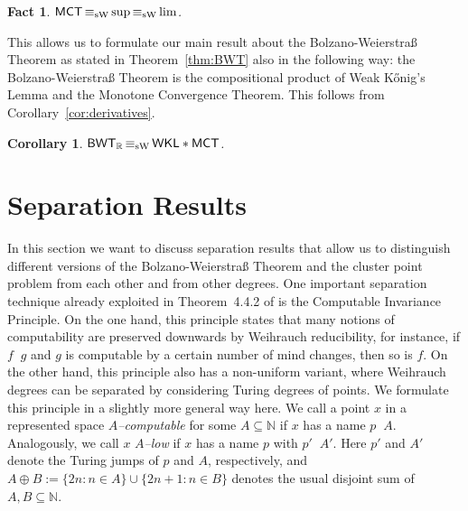 \documentclass[a4paper]{amsart}
\def\IN{{\mathbb{N}}}
\def\IR{{\mathbb{R}}}
\def\In{\subseteq}
\def\WKL{\text{\rm\sffamily WKL}}
\def\BWT{\text{\rm\sffamily BWT}}
\def\MCT{\text{\rm\sffamily MCT}}
\def\leqT{\mathop{\leq_{\mathrm{T}}}}
\def\leqW{\mathop{\leq_{\mathrm{W}}}}
\def\equivSW{\mathop{\equiv_{\mathrm{sW}}}}
\newtheorem{fact}[theorem]{Fact}
\newtheorem{corollary}[theorem]{Corollary}
\theoremstyle{definition}
\begin{document}
\begin{fact}
\label{fact:MCT}
$\MCT\equivSW\sup\equivSW\lim$.
\end{fact}

This allows us to formulate our main result about the Bolzano-Weierstra\ss{} Theorem as stated in Theorem~\ref{thm:BWT}
also in the following way:
the Bolzano-Weierstra\ss{} Theorem is the compositional product of Weak K\H{o}nig's Lemma and the
Monotone Convergence Theorem. This follows from Corollary~\ref{cor:derivatives}.

\begin{corollary}
$\BWT_\IR\equivSW\WKL*\MCT$.
\end{corollary}


\section{Separation Results}

In this section we want to discuss separation results that allow us to distinguish different
versions of the Bolzano-Weierstra\ss{} Theorem and the cluster point problem
from each other and from other degrees. 
One important separation technique already exploited in Theorem~4.4.2 of \cite{BG11a} is 
the Computable Invariance Principle. 
On the one hand, this principle states that many notions of computability are preserved
downwards by Weihrauch reducibility, for instance, if $f\leqW g$ and $g$ is computable
by a certain number of mind changes, then so is $f$. On the other hand, this
principle also has a non-uniform variant, where Weihrauch degrees can be separated
by considering Turing degrees of points. 
We formulate this principle in a slightly more general way here.
We call a point $x$ in a represented space {\em $A$--computable} for some $A\In\IN$ if $x$ has a
name $p\leqT A$.  Analogously, we call $x$ {\em $A$--low} if $x$ has a name $p$ with $p'\leqT A'$.
Here $p'$ and $A'$ denote the Turing jumps of $p$ and $A$, respectively, and $A\oplus B:=\{2n:n\in A\}\cup\{2n+1:n\in B\}$ 
denotes the usual disjoint sum of $A,B\In\IN$.
\end{document}
